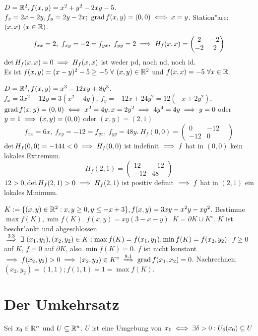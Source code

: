 \documentclass[a4paper,twoside,DIV15,BCOR12mm,chapterprefix=true,headings=twolinechapter]{scrbook}
\begin{document}
\begin{beispiele}
\item $D=\mathbb{R}^2, f(x,y)=x^2+y^2-2xy-5$. $f_x=2x-2y, f_y=2y-2x;\ \grad f(x,y)=(0,0)\equizu x=y$. Station"are: $(x,x)\ (x\in\mathbb{R})$.\\
$$f_{xx}=2,\ f_{xy}=-2=f_{yx},\ f_{yy}=2\folgt H_f(x,x)=\begin{pmatrix}2&-2\\-2&2\end{pmatrix}$$
$\det H_f(x,x)=0\implies H_f(x,x)$ ist weder pd, noch nd, noch id.\\
Es ist $f(x,y)=(x-y)^2-5\ge -5\ \forall\ (x,y)\in\MdR^2$ und $f(x,x)=-5\ \forall x\in\mathbb{R}$.
\item $D=\mathbb{R}^2, f(x,y)=x^3-12xy+8y^3$.\\
$f_x=3x^2-12y=3(x^2-4y),\ f_y=-12x+24y^2=12(-x+2y^2)$. $\grad f(x,y)=(0,0)\equizu x^2=4y, x=2y^2\folgt 4y^4=4y\folgt y=0$ oder $y=1\implies (x,y)=(0,0)$ oder $(x,y)=(2,1)$\\
$$f_{xx}=6x,\ f_{xy}=-12=f_{yx},\ f_{yy}=48y.\ H_f(0,0)=\begin{pmatrix}0&-12&\\-12&0\end{pmatrix}$$
$\det H_f(0,0)=-144<0\implies H_f(0,0)$ ist indefinit $\implies f$ hat in $(0,0)$ kein lokales Extremum. 
$$H_f(2,1)=\begin{pmatrix}12&-12\\-12&48\end{pmatrix}$$
$12>0, \det H_f(2,1)>0\implies H_f(2,1)$ ist positiv definit $\implies f$ hat in $(2,1)$ ein lokales Minimum.
\item $K:=\{(x,y)\in\mathbb{R}^2: x,y\ge 0, y\le -x+3\}, f(x,y)=3xy-x^2y-xy^2$. Bestimme $\max f(K), \min f(K)$. $f(x,y)=xy(3-x-y).\ K=\partial K \cup K^\circ$. $K$ ist beschr"ankt und abgeschlossen $\folgtnach{3.3}\exists\ (x_1,y_1), (x_2,y_2)\in K: \max f(K)=f(x_1, y_1), \min f(K)=f(x_2,y_2)$. $f\ge 0$ auf $K$, $f=0$ auf $\partial K$, also $\min f(K)=0$. $f$ ist nicht konstant $\folgt f(x_2,y_2)>0\folgt (x_2,y_2)\in K^\circ\folgtnach{8.1}\grad f(x_1,x_2)=0$. Nachrechnen: $(x_2,y_2)=(1,1); f(1,1)=1=\max f(K)$.
\end{beispiele}

\chapter{Der Umkehrsatz}
\def\grad{\mathop{\rm grad}\nolimits}

\begin{erinnerung}
Sei $x_0\in\mathbb{R}^n$ und $U\subseteq\mathbb{R}^n$. $U$ ist eine Umgebung von $x_0\iff\exists\delta>0:U_\delta(x_0)\subseteq U$
\end{erinnerung}
\end{document}
